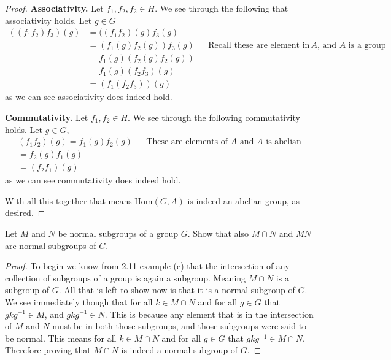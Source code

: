 \documentclass[10pt]{article}
\newenvironment{problem}[2][Problem\!]{\begin{trivlist}
\item[\hskip \labelsep {\bfseries #1}\hskip \labelsep {\bfseries #2.}]}{\end{trivlist}}
\begin{document}
\begin{proof}
    \textbf{Associativity.} Let $f_1,f_2,f_2 \in H$. We see through the following that associativity holds. Let $g\in G$
    \begin{align*}
        ((f_1f_2)f_3)(g) &= ((f_1f_2)(g)f_3(g) \\
        &= (f_1(g)f_2(g))f_3(g) && \text{Recall these are element in $A$, and $A$ is a group} \\
        &= f_1(g)(f_2(g)f_2(g)) \\
        &= f_1(g)(f_2f_3)(g) \\
        &= (f_1(f_2f_3))(g) 
    \end{align*}
    as we can see associativity does indeed hold.

    \textbf{Commutativity.} Let $f_1,f_2 \in H$. We see through the following commutativity holds. Let $g\in G$,
    \begin{align*}
        (f_1f_2)(g) = f_1(g)f_2(g) && \text{These are elements of $A$ and $A$ is abelian} \\
        = f_2(g)f_1(g)  \\
        = (f_2f_1)(g)
    \end{align*}
    as we can see commutativity does indeed hold.

    With all this together that means Hom$(G,A)$ is indeed an abelian group, as desired. 
\end{proof}

\begin{tcolorbox}
    \begin{problem}{3.1}
        Let $M$ and $N$ be normal subgroups of a group $G$. Show that also $M \cap N$ and $MN$ are normal subgroups of $G$. 
    \end{problem}
\end{tcolorbox}
\begin{proof}
    To begin we know from 2.11 example (c) that the intersection of any collection of subgroups of a group is again a subgroup. Meaning $M\cap N$ is a subgroup of $G$. All that is left to show now is that it is a normal subgroup of $G$. We see immediately though that for all $k \in M\cap N$ and for all $g\in G$ that $gkg^{-1} \in M$, and $gkg^{-1} \in N$. This is because any element that is in the intersection of $M$ and $N$ must be in both those subgroups, and those subgroups were said to be normal. This means for all $k\in M\cap N$ and for all $g\in G$ that $gkg^{-1} \in M\cap N$. Therefore proving that $M\cap N$ is indeed a normal subgroup of $G$. 
\end{proof}
\end{document}
